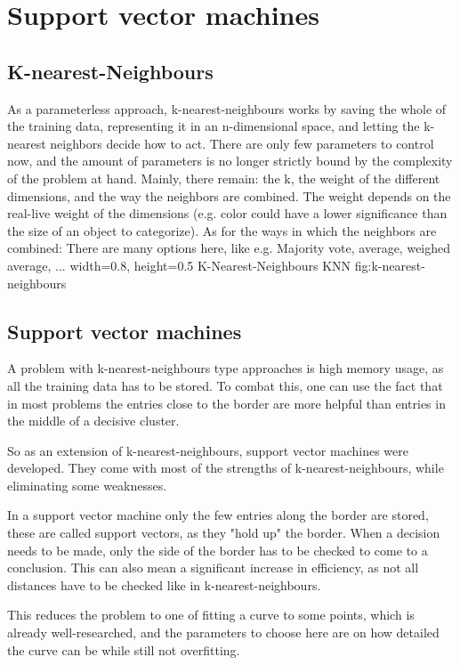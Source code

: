 \section{Support vector machines}
\label{sec:SVM}
\subsection{K-nearest-Neighbours}
As a parameterless approach, k-nearest-neighbours works by saving the whole of the training data, representing it in an n-dimensional space, and letting the k-nearest neighbors decide how to act. There are only few parameters to control now, and the amount of parameters is no longer strictly bound by the complexity of the problem at hand. Mainly, there remain: the k, the weight of the different dimensions, and the way the neighbors are combined. 
The weight depends on the real-live weight of the dimensions (e.g. color could have a lower significance than the size of an object to categorize).
As for the ways in which the neighbors are combined: There are many options here, like e.g. Majority vote, average, weighed average, ...
    {width=0.8\textwidth, height=0.5\textheight} %
    {K-Nearest-Neighbours}   %
    {KNN}   %
    {fig:k-nearest-neighbours}    %

\subsection{Support vector machines}
A problem with k-nearest-neighbours type approaches is high memory usage, as all the training data has to be stored. To combat this, one can use the fact that in most problems the entries close to the border are more helpful than entries in the middle of a decisive cluster.

So as an extension of k-nearest-neighbours, support vector machines were developed. They come with most of the strengths of k-nearest-neighbours, while eliminating some weaknesses.

In a support vector machine only the few entries along the border are stored, these are called support vectors, as they "hold up" the border. When a decision needs to be made, only the side of the border has to be checked to come to a conclusion. This can also mean a significant increase in efficiency, as not all distances have to be checked like in k-nearest-neighbours.

This reduces the problem to one of fitting a curve to some points, which is already well-researched, and the parameters to choose here are on how detailed the curve can be while still not overfitting.


